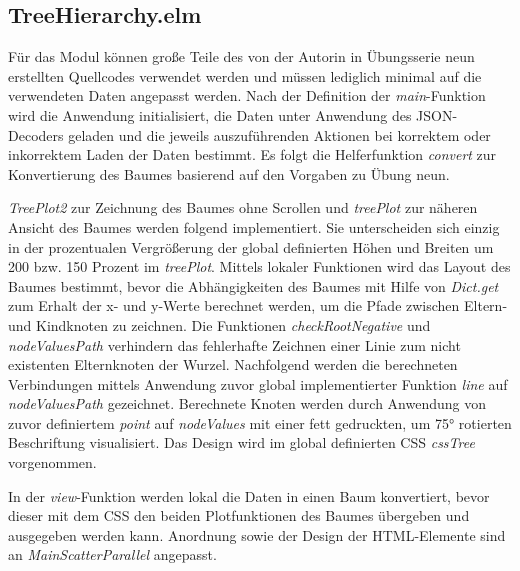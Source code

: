 \documentclass[usegeometry=true]{scrartcl}
\begin{document}
\subsection{TreeHierarchy.elm}
Für das Modul können große Teile des von der Autorin in Übungsserie neun erstellten Quellcodes verwendet werden 
und müssen lediglich minimal auf die verwendeten Daten angepasst werden. 
Nach der Definition der \textit{main}-Funktion wird die Anwendung initialisiert, 
die Daten unter Anwendung des JSON-Decoders geladen und die jeweils auszuführenden Aktionen bei korrektem oder inkorrektem Laden der Daten bestimmt. 
Es folgt die Helferfunktion \textit{convert} zur Konvertierung des Baumes basierend auf den Vorgaben zu Übung neun.


\textit{TreePlot2} zur Zeichnung des Baumes ohne Scrollen und \textit{treePlot} zur näheren Ansicht des Baumes werden folgend implementiert. 
Sie unterscheiden sich einzig in der prozentualen Vergrößerung der global definierten Höhen und Breiten um 200 bzw. 150 Prozent im \textit{treePlot}.
Mittels lokaler Funktionen wird das Layout des Baumes bestimmt, bevor die Abhängigkeiten des Baumes mit Hilfe von \textit{Dict.get} 
zum Erhalt der x- und y-Werte berechnet werden, um die Pfade zwischen Eltern- und Kindknoten zu zeichnen. 
Die Funktionen \textit{checkRootNegative} und \textit{nodeValuesPath} verhindern das fehlerhafte Zeichnen einer Linie zum nicht existenten Elternknoten der Wurzel.
Nachfolgend werden die berechneten Verbindungen mittels Anwendung zuvor global implementierter Funktion \textit{line} auf \textit{nodeValuesPath} gezeichnet.
Berechnete Knoten werden durch Anwendung von zuvor definiertem \textit{point} auf \textit{nodeValues} mit einer fett gedruckten, um 75° rotierten Beschriftung visualisiert. 
Das Design wird im global definierten CSS \textit{cssTree} vorgenommen. 

In der \textit{view}-Funktion werden lokal die Daten in einen Baum konvertiert, 
bevor dieser mit dem CSS den beiden Plotfunktionen des Baumes übergeben und ausgegeben werden kann.
Anordnung sowie der Design der HTML-Elemente sind an \textit{MainScatterParallel} angepasst. 
\end{document}
